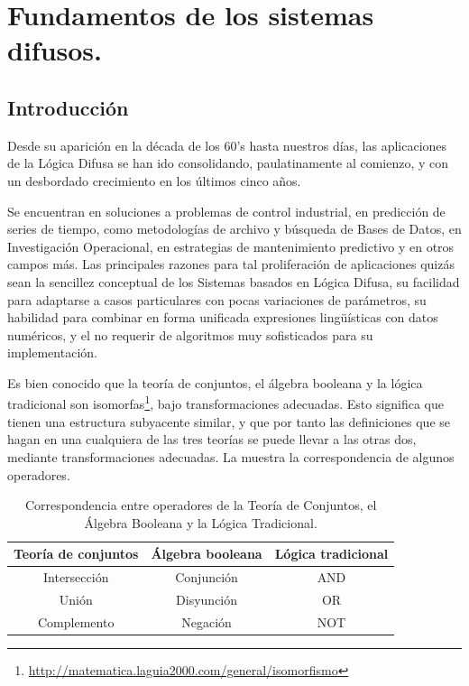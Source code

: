 \section{Fundamentos de los sistemas difusos.}

\subsection{Introducción}
Desde su aparición en la década de los 60's hasta nuestros días, las
aplicaciones de la Lógica Difusa se han ido consolidando, paulatinamente al
comienzo, y con un desbordado crecimiento en los últimos cinco años.

 Se
encuentran en soluciones a problemas de control industrial, en predicción de
series de tiempo, como metodologías de archivo y búsqueda de Bases de
Datos, en Investigación Operacional, en estrategias de mantenimiento
predictivo y en otros campos más.
Las principales razones para tal proliferación de aplicaciones quizás sean la
sencillez conceptual de los Sistemas basados en Lógica Difusa, su facilidad
para adaptarse a casos particulares con pocas variaciones de parámetros,
su habilidad para combinar en forma unificada expresiones lingüísticas con
datos numéricos, y el no requerir de algoritmos muy sofisticados para su
implementación.



Es bien conocido que la teoría de conjuntos, el álgebra booleana y la lógica
tradicional son isomorfas\footnote{\url{http://matematica.laguia2000.com/general/isomorfismo}}, bajo transformaciones adecuadas. Esto significa
que tienen una estructura subyacente similar, y que por tanto las
definiciones que se hagan en una cualquiera de las tres teorías se puede
llevar a las otras dos, mediante transformaciones adecuadas. La 
muestra la correspondencia de algunos operadores.


\begin{table}[h]
	\centering
	\begin{tabular}{@{}ccc@{}}
		\toprule
		\multicolumn{1}{l}{\textbf{Teoría de conjuntos}} & \multicolumn{1}{l}{\textbf{Álgebra booleana}} & \multicolumn{1}{l}{\textbf{Lógica tradicional}} \\ \midrule
		\multicolumn{1}{c}{Intersección}               & \multicolumn{1}{c}{Conjunción}               & \multicolumn{1}{c}{AND}                        \\ \midrule
		\multicolumn{1}{c}{Unión}                      & \multicolumn{1}{c}{Disyunción}               & \multicolumn{1}{c}{OR}                         \\ \midrule
		Complemento                                      & Negación                                      & NOT                                             \\ \bottomrule
	\end{tabular}
	\caption{Correspondencia entre operadores de la Teoría de Conjuntos, el Álgebra Booleana y la Lógica Tradicional.}
	\label{table:1}
\end{table}


